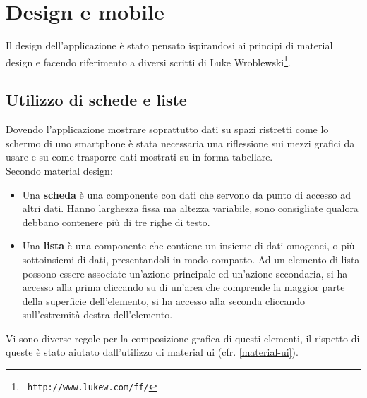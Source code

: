 \section{Design e  mobile}
Il design dell'applicazione è stato pensato ispirandosi ai principi di material design
e facendo riferimento a diversi scritti di Luke Wroblewski\footnote{\texttt{ http://www.lukew.com/ff/}}.

\subsection{Utilizzo di schede e liste}\label{schede-liste}
Dovendo l'applicazione mostrare soprattutto dati su spazi ristretti come lo schermo
di uno smartphone è stata necessaria una riflessione sui mezzi grafici da usare e
su come trasporre dati mostrati su \fiscoloWeb{} in forma tabellare. \\

Secondo material design:
\begin{itemize}
\item Una \textbf{scheda} è una componente con dati che servono da punto di accesso
ad altri dati. Hanno larghezza fissa ma altezza variabile, sono consigliate qualora
debbano contenere più di tre righe di testo.
\item Una \textbf{lista} è una componente che contiene un insieme di dati omogenei,
o più sottoinsiemi di dati, presentandoli in modo compatto. Ad un elemento di lista
possono essere associate un'azione principale ed un'azione secondaria, si ha accesso
alla prima cliccando su di un'area che comprende la maggior parte della superficie
dell'elemento, si ha accesso alla seconda cliccando sull'estremità destra dell'elemento.
\end{itemize}

Vi sono diverse regole per la composizione grafica di questi elementi, il rispetto
di queste è stato aiutato dall'utilizzo di material ui (cfr. \ref{material-ui}). \\

